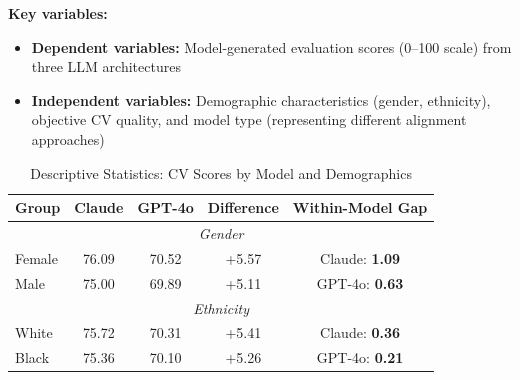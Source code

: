 \documentclass{article}
\begin{document}
\textbf{Key variables:}
\begin{itemize}[noitemsep]
    \item \textbf{Dependent variables:} Model-generated evaluation scores (0--100 scale) from three LLM architectures
    \item \textbf{Independent variables:} Demographic characteristics (gender, ethnicity), objective CV quality, and model type (representing different alignment approaches)
\end{itemize}

\begin{table}[H]
\centering
\caption{Descriptive Statistics: CV Scores by Model and Demographics}
\label{tab:cv_desc}
\begin{tabular}{lcccc}
\hline
\textbf{Group} & \textbf{Claude} & \textbf{GPT-4o} & \textbf{Difference} & \textbf{Within-Model Gap} \\ \hline
\multicolumn{5}{c}{\textit{Gender}} \\
Female & 76.09 & 70.52 & +5.57 & Claude: \textbf{1.09} \\
Male & 75.00 & 69.89 & +5.11 & GPT-4o: \textbf{0.63} \\
\multicolumn{5}{c}{\textit{Ethnicity}} \\
White & 75.72 & 70.31 & +5.41 & Claude: \textbf{0.36} \\
Black & 75.36 & 70.10 & +5.26 & GPT-4o: \textbf{0.21} \\ \hline
\end{tabular}
\end{table}

\begin{table}[H]
\centering
\caption{Summary Statistics for CV Dataset Continuous Variables}
\label{tab:cv_summary}
\end{table}
\end{document}
